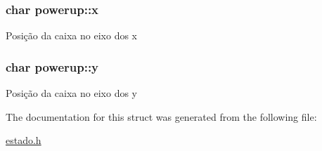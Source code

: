 \subsubsection[{\texorpdfstring{x}{x}}]{\setlength{\rightskip}{0pt plus 5cm}char powerup\+::x}\hypertarget{structpowerup_a69ca024006b9be4276b9dcc238e44cfe}{}\label{structpowerup_a69ca024006b9be4276b9dcc238e44cfe}
Posição da caixa no eixo dos x 
\subsubsection[{\texorpdfstring{y}{y}}]{\setlength{\rightskip}{0pt plus 5cm}char powerup\+::y}\hypertarget{structpowerup_a4025da7ede0b755cc723310e77fd0c00}{}\label{structpowerup_a4025da7ede0b755cc723310e77fd0c00}
Posição da caixa no eixo dos y 

The documentation for this struct was generated from the following file\+:\begin{DoxyCompactItemize}
\item 
\hyperlink{estado_8h}{estado.\+h}\end{DoxyCompactItemize}
